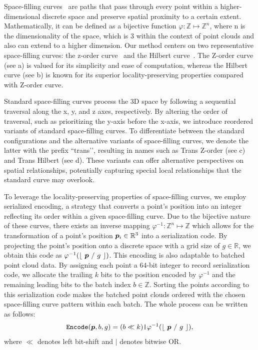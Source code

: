  Space-filling curves~\cite{peano1990courbe} are paths that pass through every point within a higher-dimensional discrete space and preserve spatial proximity to a certain extent.
Mathematically, it can be defined as a bijective function $\varphi:  \mathbb{Z} \mapsto \mathbb{Z}^n$, where n is the dimensionality of the space, which is 3 within the context of point clouds and also can extend to a higher dimension. Our method centers on two representative space-filling curves: the z-order curve~\cite{morton1966computer} and the Hilbert curve~\cite{hilbert1935stetige}. The Z-order curve (see \textcolor{link}{a}) is valued for its simplicity and ease of computation, whereas the Hilbert curve (see \textcolor{link}{b}) is known for its superior locality-preserving properties compared with Z-order curve. 

Standard space-filling curves process the 3D space by following a sequential traversal along the x, y, and z axes, respectively. By altering the order of traversal, such as prioritizing the y-axis before the x-axis, we introduce reordered variants of standard space-filling curves. To differentiate between the standard configurations and the alternative variants of space-filling curves, we denote the latter with the prefix ``trans'’, resulting in names such as Trans Z-order (see \textcolor{link}{c}) and Trans Hilbert (see \textcolor{link}{d}). These variants can offer alternative perspectives on spatial relationships, potentially capturing special local relationships that the standard curve may overlook. 

 To leverage the locality-preserving properties of space-filling curves, we employ serialized encoding, a strategy that converts a point's position into an integer reflecting its order within a given space-filling curve. Due to the bijective nature of these curves, there exists an inverse mapping $\varphi^{-1}:  \mathbb{Z}^n \mapsto \mathbb{Z}$ which allows for the transformation of a point's position ${\bm{p}}_i \in \mathbb{R}^3$ into a serialization code. By projecting the point's position onto a discrete space with a grid size of $g \in \mathbb{R}$, we obtain this code as $\varphi^{-1}(\lfloor\ \vp\ /\ g\ \rfloor)$. This encoding is also adaptable to batched point cloud data. By assigning each point a 64-bit integer to record serialization code, we allocate the trailing $k$ bits to the position encoded by $\varphi^{-1}$ and the remaining leading bits to the batch index $b \in \mathbb{Z}$. Sorting the points according to this serialization code makes the batched point clouds ordered with the chosen space-filling curve pattern within each batch. The whole process can be written as follows:
\vspace{-5mm}
\begin{align*}
    \texttt{Encode}({\bm{p}}, b, g) = (b \ll k) \texttt{|} \varphi^{-1}(\lfloor\ {\bm{p}}\ /\ g\ \rfloor) ,
    \label{eq:encode}
\end{align*}
 where $\ll$ denotes left bit-shift and $\texttt{|}$ denotes bitwise OR.
 
